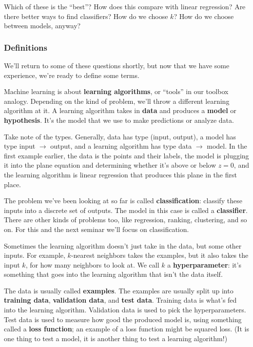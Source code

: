 \documentclass[11pt,paper=letter]{scrartcl}
\begin{document}
Which of these is the ``best''? How does this compare with linear regression? Are there better ways to find classifiers? How do we choose $k$? How do we choose between models, anyway?

\subsubsection*{Definitions}

We'll return to some of these questions shortly, but now that we have some experience, we're ready to define some terms.

Machine learning is about \textbf{learning algorithms}, or ``tools'' in our toolbox analogy. Depending on the kind of problem, we'll throw a different learning algorithm at it. A learning algorithm takes in \textbf{data} and produces a \textbf{model} or \textbf{hypothesis}. It's the model that we use to make predictions or analyze data.

Take note of the types. Generally, data has type (input, output), a model has type input $\to$ output, and a learning algorithm has type data $\to$ model. In the first example earlier, the data is the points and their labels, the model is plugging it into the plane equation and determining whether it's above or below $z = 0$, and the learning algorithm is linear regression that produces this plane in the first place.

The problem we've been looking at so far is called \textbf{classification}: classify these inputs into a discrete set of outputs. The model in this case is called a \textbf{classifier}. There are other kinds of problems too, like regression, ranking, clustering, and so on. For this and the next seminar we'll focus on classification.

Sometimes the learning algorithm doesn't just take in the data, but some other inputs. For example, $k$-nearest neighbors takes the examples, but it also takes the input $k$, for how many neighbors to look at. We call $k$ a \textbf{hyperparameter}: it's something that goes into the learning algorithm that isn't the data itself.

The data is usually called \textbf{examples}. The examples are usually split up into \textbf{training data}, \textbf{validation data}, and \textbf{test data}. Training data is what's fed into the learning algorithm. Validation data is used to pick the hyperparameters. Test data is used to measure how good the produced model is, using something called a \textbf{loss function}; an example of a loss function might be squared loss. (It is one thing to test a model, it is another thing to test a learning algorithm!)
\end{document}
